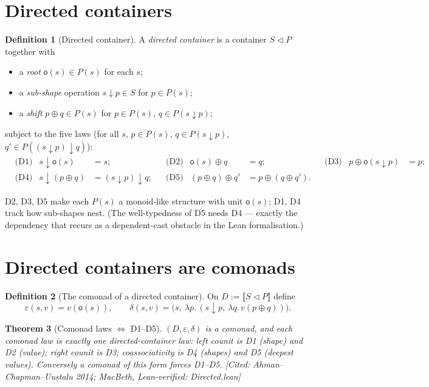 \documentclass[11pt,a4paper]{book}
\newcommand{\cont}[2]{#1 \triangleleft #2}
\newcommand{\Ext}[1]{\llbracket #1 \rrbracket}
\theoremstyle{plain}
\newtheorem{Theorem}{Theorem}[chapter]
\theoremstyle{definition}
\newtheorem{Definition}[Theorem]{Definition}
\theoremstyle{remark}
\newcommand{\prov}[1]{\hfill\textsf{\footnotesize[#1]}}
\begin{document}
\section{Directed containers}

\begin{Definition}[Directed container]\label{def:dcont}
A \emph{directed container} is a container $\cont SP$ together with
\begin{itemize}[nosep]
  \item a \emph{root} $\mathsf o(s)\in P(s)$ for each $s$;
  \item a \emph{sub-shape} operation $s\downarrow p\in S$ for $p\in P(s)$;
  \item a \emph{shift} $p\oplus q\in P(s)$ for $p\in P(s)$, $q\in P(s\downarrow p)$;
\end{itemize}
subject to the five laws (for all $s$, $p\in P(s)$, $q\in P(s\downarrow p)$,
$q'\in P((s\downarrow p)\downarrow q)$):
\begin{align*}
  &\text{(D1)} & s\downarrow\mathsf o(s)&=s;
  & &\text{(D2)} & \mathsf o(s)\oplus q&=q;
  & &\text{(D3)} & p\oplus\mathsf o(s\downarrow p)&=p;\\
  &\text{(D4)} & s\downarrow(p\oplus q)&=(s\downarrow p)\downarrow q;
  & &\text{(D5)} & (p\oplus q)\oplus q'&=p\oplus(q\oplus q').
\end{align*}
\end{Definition}

\noindent D2, D3, D5 make each $P(s)$ a monoid-like structure with unit
$\mathsf o(s)$; D1, D4 track how sub-shapes nest. (The well-typedness of D5 needs
D4 --- exactly the dependency that recurs as a dependent-cast obstacle in the Lean
formalisation.)

\section{Directed containers are comonads}

\begin{Definition}[The comonad of a directed container]\label{def:dcomonad}
On $D:=\Ext{\cont SP}$ define
\[
  \varepsilon(s,v)=v(\mathsf o(s)),\qquad
  \delta(s,v)=\bigl(s,\ \lambda p.\,(s\downarrow p,\ \lambda q.\, v(p\oplus q))\bigr).
\]
\end{Definition}

\begin{Theorem}[Comonad laws $\Longleftrightarrow$ D1--D5]\label{thm:comonad}
$(D,\varepsilon,\delta)$ is a comonad, and each comonad law is exactly one
directed-container law: left counit is D1 (shape) and D2 (value); right counit is
D3; coassociativity is D4 (shapes) and D5 (deepest values). Conversely a comonad
of this form forces D1--D5.
\prov{Cited: Ahman--Chapman--Uustalu 2014; MacBeth, Lean-verified:
Directed.lean}
\end{Theorem}
\end{document}
